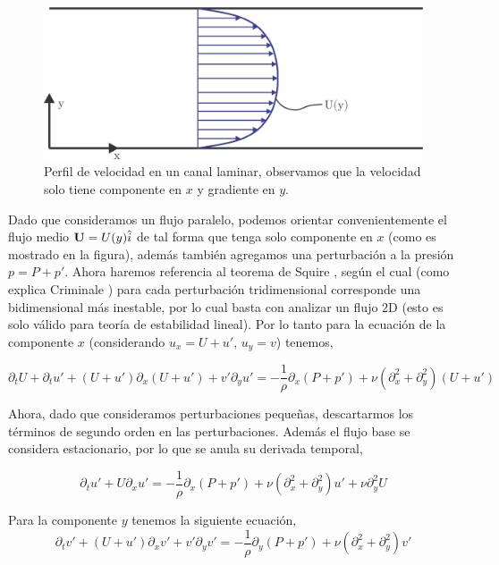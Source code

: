 \documentclass[executivepaper,12pt]{article}
\numberwithin{equation}{section}
\begin{document}
\begin{figure}[H]
	\begin{center}
		\includegraphics[scale=1]{estabilidad1}
	\end{center}
	\caption{Perfil de velocidad en un canal laminar, observamos que la velocidad solo tiene componente en $x$ y gradiente en $y$.}
	\label{fig-stability1}
\end{figure}


Dado que consideramos un flujo paralelo, podemos orientar convenientemente el flujo medio $\vb{U}=U(y)\hat{i}$ de tal forma que tenga solo componente en $x$ (como es mostrado en la figura), además también agregamos una perturbación a la presión $p=P+p'$.  Ahora haremos referencia al teorema de Squire \parencite{squire1933}, según el cual (como explica Criminale \parencite{criminale2018}) para cada perturbación tridimensional corresponde una bidimensional más inestable, por lo cual basta con analizar un flujo 2D (esto es solo válido para teoría de estabilidad lineal). Por lo tanto para la ecuación de la componente $x$ (considerando $u_x=U+u'$, $u_y=v$) tenemos,

\begin{equation*}
	\partial_t U +\partial_t u' +(U+u')\partial_x (U+u') + v'\partial_y u'  =-\frac{1}{\rho} \partial_x(P+p')+\nu(\partial_x^2 + \partial_y^2 )(U+u')
\end{equation*}

Ahora, dado que consideramos perturbaciones pequeñas, descartarmos los términos de segundo orden en las perturbaciones. Además el flujo base se considera estacionario, por lo que se anula su derivada temporal,

\begin{equation*}
	\partial_t u' +U\partial_x u'  =-\frac{1}{\rho} \partial_x(P+p')+\nu(\partial_x^2 + \partial_y^2 )u' +\nu\partial_y^2 U
\end{equation*}

Para la componente $y$ tenemos la siguiente ecuación,
\begin{equation*}
	\partial_tv' + (U+u')\partial_x v' +v'\partial_y v' = -\frac{1}{\rho} \partial_y(P+p')+\nu (\partial_x^2 +\partial_y^2)v'
\end{equation*}
\end{document}
